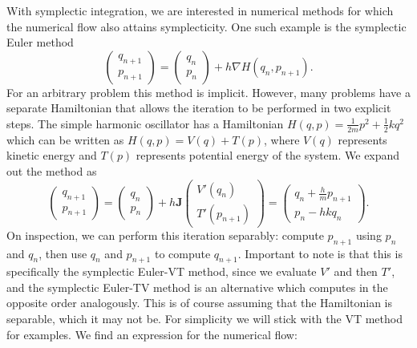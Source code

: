 With symplectic integration, we are interested in numerical methods for which the numerical flow also attains symplecticity.
One such example is the symplectic Euler method
\begin{equation*}
	\begin{pmatrix}
		q_{n+1} \\
		p_{n+1} 
	\end{pmatrix} = \begin{pmatrix}
		q_{n} \\
		p_{n}
	\end{pmatrix} + h \nabla H(q_{n}, p_{n+1}).
\end{equation*}
For an arbitrary problem this method is implicit. However, many problems have a separate Hamiltonian that allows the iteration to be performed in two explicit steps. 
The simple harmonic oscillator has a Hamiltonian $H(q, p) = \frac{1}{2m}p^2 + \frac{1}{2}kq^2$ which can be written as $H(q, p) = V(q) + T(p)$, where $V(q)$ represents kinetic energy and $T(p)$ represents potential energy of the system.
We expand out the method as
\begin{equation*}
	\begin{pmatrix}
		q_{n+1} \\
		p_{n+1} 
	\end{pmatrix} = \begin{pmatrix}
		q_{n} \\
		p_{n}
	\end{pmatrix} + h \mathbf{J} \begin{pmatrix}
		V'(q_n) \\
		T'(p_{n+1})
	\end{pmatrix} = \begin{pmatrix}
		q_{n} + \frac{h}{m}p_{n+1} \\
		p_{n} - hk q_n
	\end{pmatrix}.
\end{equation*}
On inspection, we can perform this iteration separably: compute $p_{n+1}$ using $p_n$ and $q_n$,
then use $q_n$ and $p_{n+1}$ to compute $q_{n+1}$.
Important to note is that this is specifically the symplectic Euler-VT method, since we evaluate $V'$ and then $T'$,
and the symplectic Euler-TV method is an alternative which computes in the opposite order analogously.
This is of course assuming that the Hamiltonian is separable, which it may not be.
For simplicity we will stick with the VT method for examples.
We find an expression for the numerical flow:
